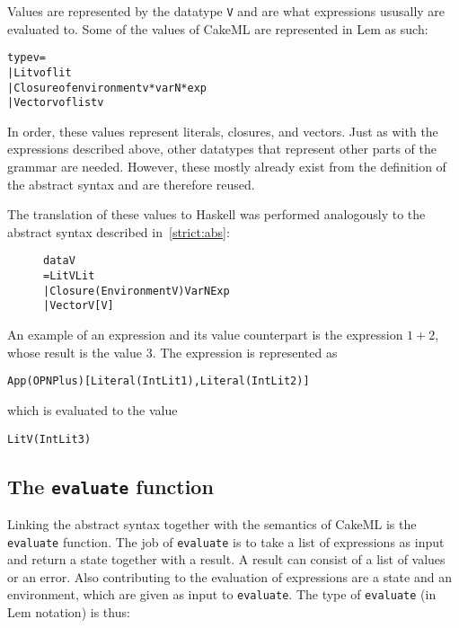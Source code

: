 Values are represented by the datatype \texttt{V} and are what expressions
ususally are evaluated to. Some of the values of CakeML are represented in
Lem as such:

\begin{alltt}
  type v =
    | Litv of lit
    | Closure of environment v * varN * exp
    | Vectorv of list v
\end{alltt}

\noindent In order, these values represent literals, closures, and vectors.
Just as with the expressions described above, other datatypes that represent
other parts of the grammar are needed. However, these mostly already exist from
the definition of the abstract syntax and are therefore reused.

The translation of these values to Haskell was performed analogously to the
abstract syntax described in~\ref{strict:abs}:

\begin{figure}[H]
\begin{alltt}
  data V
    = LitV Lit
    | Closure (Environment V) VarN Exp
    | VectorV [V]
\end{alltt}
\end{figure}

An example of an expression and its value counterpart is the expression $1 + 2$,
whose result is the value 3. The expression is represented as
\begin{alltt}
  App (OPN Plus) [Literal (IntLit 1), Literal (IntLit 2)]
\end{alltt}
which is evaluated to the value
\begin{alltt}
  LitV (IntLit 3)
\end{alltt}


\subsection{The \texttt{evaluate} function}
Linking the abstract syntax together with the semantics of CakeML is the
\texttt{evaluate} function. The job of \texttt{evaluate} is to take a list of
expressions as input and return a state together with a result. A result can
consist of a list of values or an error. Also contributing to the evaluation
of expressions are a state and an environment, which are given as input to
\texttt{evaluate}. The type of \texttt{evaluate} (in Lem notation) is thus:

